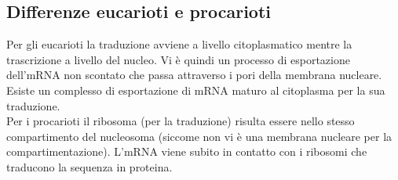    \subsection{Differenze eucarioti e procarioti}
        Per gli eucarioti la traduzione avviene a livello citoplasmatico mentre la trascrizione a livello del nucleo. Vi è quindi un processo di esportazione dell'mRNA non scontato che passa attraverso i pori della membrana nucleare. Esiste un complesso di esportazione di mRNA maturo al citoplasma per la sua traduzione.\\
        Per i procarioti il ribosoma (per la traduzione) risulta essere nello stesso compartimento del nucleosoma (siccome non vi è una membrana nucleare per la compartimentazione). L'mRNA viene subito in contatto con i ribosomi che traducono la sequenza in proteina.
        
